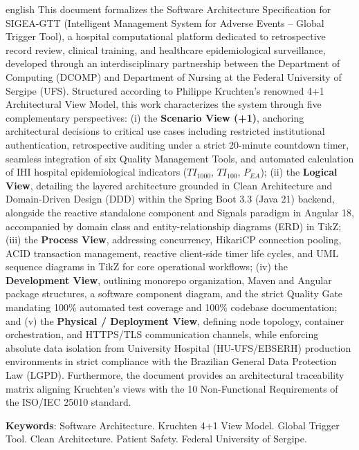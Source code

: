 \begin{resumo}[Abstract]
\begin{otherlanguage*}{english}
This document formalizes the Software Architecture Specification for SIGEA-GTT (Intelligent Management System for Adverse Events -- Global Trigger Tool), a hospital computational platform dedicated to retrospective record review, clinical training, and healthcare epidemiological surveillance, developed through an interdisciplinary partnership between the Department of Computing (DCOMP) and Department of Nursing at the Federal University of Sergipe (UFS). Structured according to Philippe Kruchten's renowned 4+1 Architectural View Model, this work characterizes the system through five complementary perspectives: (i) the \textbf{Scenario View (+1)}, anchoring architectural decisions to critical use cases including restricted institutional authentication, retrospective auditing under a strict 20-minute countdown timer, seamless integration of six Quality Management Tools, and automated calculation of IHI hospital epidemiological indicators ($TI_{1000}$, $TI_{100}$, $P_{EA}$); (ii) the \textbf{Logical View}, detailing the layered architecture grounded in Clean Architecture and Domain-Driven Design (DDD) within the Spring Boot 3.3 (Java 21) backend, alongside the reactive standalone component and Signals paradigm in Angular 18, accompanied by domain class and entity-relationship diagrams (ERD) in TikZ; (iii) the \textbf{Process View}, addressing concurrency, HikariCP connection pooling, ACID transaction management, reactive client-side timer life cycles, and UML sequence diagrams in TikZ for core operational workflows; (iv) the \textbf{Development View}, outlining monorepo organization, Maven and Angular package structures, a software component diagram, and the strict Quality Gate mandating 100\% automated test coverage and 100\% codebase documentation; and (v) the \textbf{Physical / Deployment View}, defining node topology, container orchestration, and HTTPS/TLS communication channels, while enforcing absolute data isolation from University Hospital (HU-UFS/EBSERH) production environments in strict compliance with the Brazilian General Data Protection Law (LGPD). Furthermore, the document provides an architectural traceability matrix aligning Kruchten's views with the 10 Non-Functional Requirements of the ISO/IEC 25010 standard.

\vspace{\onelineskip}
\noindent
\textbf{Keywords}: Software Architecture. Kruchten 4+1 View Model. Global Trigger Tool. Clean Architecture. Patient Safety. Federal University of Sergipe.
\end{otherlanguage*}
\end{resumo}
